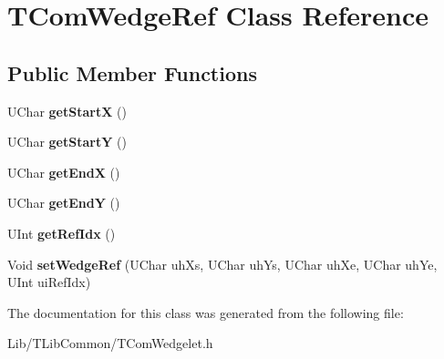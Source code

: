 \hypertarget{class_t_com_wedge_ref}{}\section{T\+Com\+Wedge\+Ref Class Reference}
\label{class_t_com_wedge_ref}
\subsection*{Public Member Functions}
\begin{DoxyCompactItemize}
\item 
\mbox{\label{class_t_com_wedge_ref_a5f472b048ee568197f278788f757ba22}} 
U\+Char {\bfseries get\+StartX} ()
\item 
\mbox{\label{class_t_com_wedge_ref_ad0173d35323c392788567bf38fdd9680}} 
U\+Char {\bfseries get\+StartY} ()
\item 
\mbox{\label{class_t_com_wedge_ref_a2e2e3c95150e9c7e5cfa90d60f47e0a5}} 
U\+Char {\bfseries get\+EndX} ()
\item 
\mbox{\label{class_t_com_wedge_ref_a3b15886256fe5863ff1989d1d4bd1977}} 
U\+Char {\bfseries get\+EndY} ()
\item 
\mbox{\label{class_t_com_wedge_ref_a619e578f2456bed4f4f3ee7e19f9b01a}} 
U\+Int {\bfseries get\+Ref\+Idx} ()
\item 
\mbox{\label{class_t_com_wedge_ref_ad13578905385da20f5d7623747926c81}} 
Void {\bfseries set\+Wedge\+Ref} (U\+Char uh\+Xs, U\+Char uh\+Ys, U\+Char uh\+Xe, U\+Char uh\+Ye, U\+Int ui\+Ref\+Idx)
\end{DoxyCompactItemize}


The documentation for this class was generated from the following file\+:\begin{DoxyCompactItemize}
\item 
Lib/\+T\+Lib\+Common/T\+Com\+Wedgelet.\+h\end{DoxyCompactItemize}
